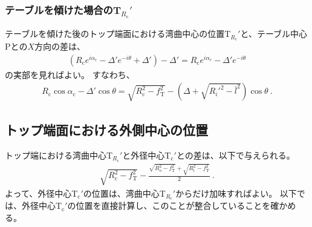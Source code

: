 \subsubsection{テーブルを傾けた場合のT\texorpdfstring{$_{R_\mathrm c}'$}{Rc'}}
テーブルを傾けた後のトップ端面における湾曲中心の位置T$_{R_\mathrm c}'$と、テーブル中心Pとの$X$方向の差は、
\begin{align*}
  \left(R_\mathrm ce^{i\alpha_\mathrm c}-\varDelta'e^{-i\theta}+\varDelta'\right)-\varDelta'
  = R_\mathrm ce^{i\alpha_\mathrm c}-\varDelta'e^{-i\theta}
\end{align*}
の実部を見ればよい。
すなわち、
\begin{align}
  \label{eq:tableTRc}
  R_\mathrm c\cos\alpha_\mathrm c-\varDelta'\cos\theta
  = \sqrt{R_\mathrm c^2-f_\mathrm T^2}-\left(\varDelta+\sqrt{R_i'^2-\bar l^2}\right)\cos\theta~.
\end{align}



\subsection{トップ端面における外側中心の位置}
トップ端における湾曲中心T$_{R_\mathrm c}'$と外径中心T$_\mathrm c'$との差は、以下で与えられる。
\begin{align}
  \label{eq:TRc-Tc}
  \sqrt{R_\mathrm c^2-f_\mathrm T^2}
  -\frac{\sqrt{R_\mathrm o^2-f_\mathrm T^2}+\sqrt{R_\mathrm i^2-f_\mathrm T^2}}2\ .
\end{align}
よって、外径中心T$_\mathrm c'$の位置は、湾曲中心T$_{R_\mathrm c}'$からだけ加味すればよい。
以下では、外径中心T$_\mathrm c'$の位置を直接計算し、このことが整合していることを確かめる。



